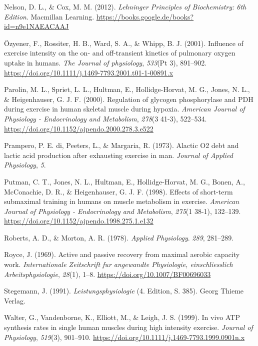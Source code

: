 \documentclass[
  letterpaper,
  DIV=11]{scrartcl}
\newlength{\cslhangindent}
\newenvironment{CSLReferences}[2] %
 {\begin{list}{}{%
  \setlength{\itemindent}{0pt}
  \setlength{\leftmargin}{0pt}
  \setlength{\parsep}{0pt}
  \ifodd #1
   \setlength{\leftmargin}{\cslhangindent}
   \setlength{\itemindent}{-1\cslhangindent}
  \fi
  \setlength{\itemsep}{#2\baselineskip}}}
 {\end{list}}
\begin{document}
\begin{CSLReferences}{1}{0}
Nelson, D. L., \& Cox, M. M. (2012). \emph{{Lehninger Principles of
Biochemistry: 6th Edition}}. Macmillan Learning.
\url{https://books.google.de/books?id=n9e1NAEACAAJ}

Özyener, F., Rossiter, H. B., Ward, S. A., \& Whipp, B. J. (2001).
{Influence of exercise intensity on the on- and off-transient kinetics
of pulmonary oxygen uptake in humans.} \emph{The Journal of physiology},
\emph{533}(Pt 3), 891--902.
\url{https://doi.org/10.1111/j.1469-7793.2001.t01-1-00891.x}

Parolin, M. L., Spriet, L. L., Hultman, E., Hollidge-Horvat, M. G.,
Jones, N. L., \& Heigenhauser, G. J. F. (2000). {Regulation of glycogen
phosphorylase and PDH during exercise in human skeletal muscle during
hypoxia}. \emph{American Journal of Physiology - Endocrinology and
Metabolism}, \emph{278}(3 41-3), 522--534.
\url{https://doi.org/10.1152/ajpendo.2000.278.3.e522}

Prampero, P. E. di, Peeters, L., \& Margaria, R. (1973). {Alactic O2
debt and lactic acid production after exhausting exercise in man}.
\emph{Journal of Applied Physiology}, \emph{5}.

Putman, C. T., Jones, N. L., Hultman, E., Hollidge-Horvat, M. G., Bonen,
A., McConachie, D. R., \& Heigenhauser, G. J. F. (1998). {Effects of
short-term submaximal training in humans on muscle metabolism in
exercise}. \emph{American Journal of Physiology - Endocrinology and
Metabolism}, \emph{275}(1 38-1), 132--139.
\url{https://doi.org/10.1152/ajpendo.1998.275.1.e132}

Roberts, A. D., \& Morton, A. R. (1978). \emph{{Applied Physiology}}.
\emph{289}, 281--289.

Royce, J. (1969). {Active and passive recovery from maximal aerobic
capacity work}. \emph{Internationale Zeitschrift fur angewandte
Physiologie, einschliesslich Arbeitsphysiologie}, \emph{28}(1), 1--8.
\url{https://doi.org/10.1007/BF00696033}

Stegemann, J. (1991). \emph{{Leistungsphysiologie}} (4. Edition, S.
385). Georg Thieme Verlag.

Walter, G., Vandenborne, K., Elliott, M., \& Leigh, J. S. (1999). {In
vivo ATP synthesis rates in single human muscles during high intensity
exercise}. \emph{Journal of Physiology}, \emph{519}(3), 901--910.
\url{https://doi.org/10.1111/j.1469-7793.1999.0901n.x}

\end{CSLReferences}
\end{document}
